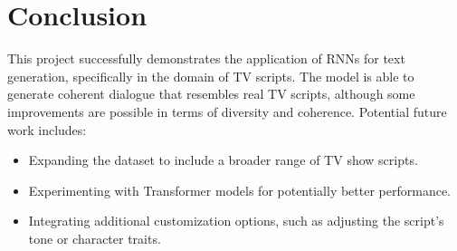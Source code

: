 \documentclass{article}
\begin{document}
\section{Conclusion}
This project successfully demonstrates the application of RNNs for text generation, specifically in the domain of TV scripts. The model is able to generate coherent dialogue that resembles real TV scripts, although some improvements are possible in terms of diversity and coherence. Potential future work includes:
\begin{itemize}
    \item Expanding the dataset to include a broader range of TV show scripts.
    \item Experimenting with Transformer models for potentially better performance.
    \item Integrating additional customization options, such as adjusting the script’s tone or character traits.
\end{itemize}
\end{document}
